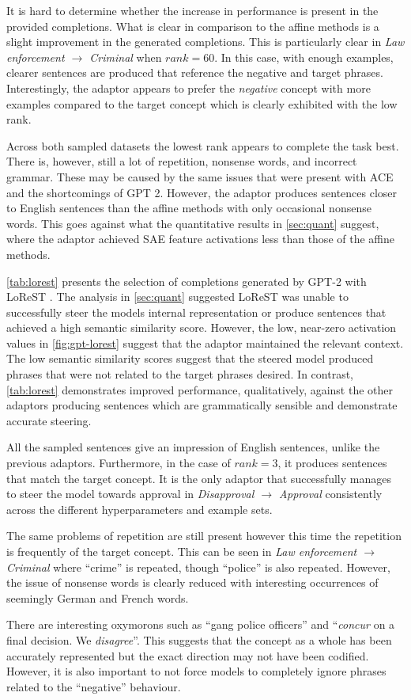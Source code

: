 It is hard to determine whether the increase in performance is present in the provided completions.
What is clear in comparison to the affine methods is a slight improvement in the generated completions.
This is particularly clear in \emph{Law enforcement $\to$ Criminal} when $rank = 60$.
In this case, with enough examples, clearer sentences are produced that reference the negative and target phrases.
Interestingly, the adaptor appears to prefer the \emph{negative} concept with more examples compared to the target concept which is clearly exhibited with the low rank.

Across both sampled datasets the lowest rank appears to complete the task best.
There is, however, still a lot of repetition, nonsense words, and incorrect grammar.
These may be caused by the same issues that were present with ACE and the shortcomings of GPT 2.
However, the adaptor produces sentences closer to English sentences than the affine methods with only occasional nonsense words.
This goes against what the quantitative results in \cref{sec:quant} suggest, where the adaptor achieved SAE feature activations less than those of the affine methods.




\cref{tab:lorest} presents the selection of completions generated by GPT-2 with LoReST \citep{steering-clear}.
The analysis in \cref{sec:quant} suggested LoReST was unable to successfully steer the models internal representation or produce sentences that achieved a high semantic similarity score.
However, the low, near-zero activation values in \cref{fig:gpt-lorest} suggest that the adaptor maintained the relevant context.
The low semantic similarity scores suggest that the steered model produced phrases that were not related to the target phrases desired.
In contrast, \cref{tab:lorest} demonstrates improved performance, qualitatively, against the other adaptors producing sentences which are grammatically sensible and demonstrate accurate steering.

All the sampled sentences give an impression of English sentences, unlike the previous adaptors.
Furthermore, in the case of $rank = 3$, it produces sentences that match the target concept.
It is the only adaptor that successfully manages to steer the model towards approval in \emph{Disapproval $\to$ Approval} consistently across the different hyperparameters and example sets.

The same problems of repetition are still present however this time the repetition is frequently of the target concept.
This can be seen in \emph{Law enforcement $\to$ Criminal} where ``crime'' is repeated, though ``police'' is also repeated.
However, the issue of nonsense words is clearly reduced with interesting occurrences of seemingly German and French words.

There are interesting oxymorons such as ``gang police officers'' and ``\emph{concur} on a final decision. We \emph{disagree}''.
This suggests that the concept as a whole has been accurately represented but the exact direction may not have been codified.
However, it is also important to not force models to completely ignore phrases related to the ``negative'' behaviour.
